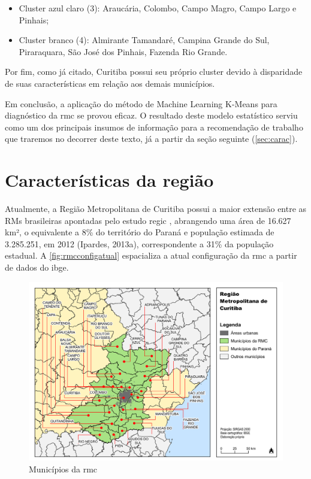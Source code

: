 	\begin{itemize}
		\item Cluster azul claro (3): Araucária, Colombo, Campo Magro, Campo Largo e Pinhais;
		\item Cluster branco (4): Almirante Tamandaré, Campina Grande do Sul, Piraraquara, São José dos Pinhais, Fazenda Rio Grande.
	\end{itemize}
	
	Por fim, como já citado, Curitiba possui seu próprio cluster devido à disparidade de suas características em relação aos demais municípios.
	
	Em conclusão, a aplicação do método de Machine Learning K-Means para diagnóstico da \gls{rmc} se provou eficaz. O resultado deste modelo estatístico serviu como um dos principais insumos de informação para a recomendação de trabalho que traremos no decorrer deste texto, já a partir da seção seguinte (\autoref{sec:carac}).
	
	\section{Características da região} \label{sec:carac}
	
	Atualmente, a Região Metropolitana de Curitiba possui a maior extensão entre as RMs brasileiras apontadas pelo estudo \gls{regic} \cite{regic2008a}, abrangendo uma área de 16.627 km², o equivalente a 8\% do território do Paraná e população estimada de 3.285.251, em 2012 (Ipardes, 2013a), correspondente a 31\% da população estadual. A \autoref{fig:rmcconfigatual} espacializa a atual configuração da \gls{rmc} a partir de dados do \gls{ibge}.
	
	\begin{landscape}
		\begin{figure}
			\centering
			\caption{Municípios da \glsdesc{rmc}}
			\label{fig:rmcconfigatual}
			\includegraphics[width=0.85\linewidth]{../gis/produtos/RMC_config_atual}
		\end{figure}
	\end{landscape}

